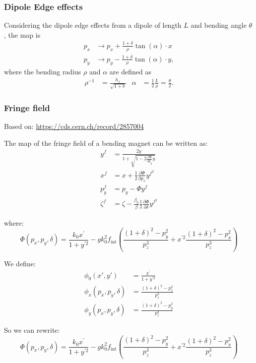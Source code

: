 \subsubsection{Dipole Edge effects}
Considering the dipole edge effects from a dipole of length $L$ and bending angle $\theta$, 
the map is
\begin{align*}
    p_x &\to p_x + \frac{1+\delta}{\rho} \tan(\alpha) \cdot x \\
    p_y &\to p_y - \frac{1+\delta}{\rho} \tan(\alpha) \cdot y,
\end{align*}
where the bending radius $\rho$ and $\alpha$ are defined as
\begin{align*}
    \rho^{-1}   &= \frac{h_x}{\sqrt{1+\delta}} &
    \alpha &= \frac{1}{2} \frac{L}{\rho} = \frac{\theta}{2}.
\end{align*}

\subsubsection{Fringe field}

Based on: \url{https://cds.cern.ch/record/2857004}

The map of the fringe field of a bending magnet can be written as:
\begin{align} 
y^f & =\frac{2 y}{1+\sqrt{1-2 \frac{\partial \Phi}{\partial p_y} y}} \\ 
x^f & =x+\frac{1}{2} \frac{\partial \Phi}{\partial p_x} y^{f^2} \\
p_y^f & =p_y-\Phi y^f \\ 
\zeta^f & =\zeta-\frac{\beta_0}{\beta}\frac{1}{2} \frac{\partial \Phi}{\partial \delta} y^{f^2}
\end{align}

where:
\begin{equation}
\Phi\left(p_x, p_y, \delta\right)=\frac{k_0 x^{\prime}}{1+y^{\prime 2}}
-g k_0^2 f_\text{int}
\left(\frac{(1+\delta)^2-p_y^2}{p_z^3}
+x^{\prime 2}
\frac{(1+\delta)^2-p_x^2}{p_z^3}\right)
\end{equation}

We define:
\begin{align}
\phi_0(x', y') &= \frac{x^{\prime}}{1+y^{\prime 2}}\\
\phi_x(p_x, p_y, \delta) &= \frac{(1+\delta)^2-p_x^2}{p_z^3}\\
\phi_y(p_x, p_y, \delta) &= \frac{(1+\delta)^2-p_y^2}{p_z^3}
\end{align}

So we can rewrite:
\begin{equation}
\Phi\left(p_x, p_y, \delta\right)=\frac{k_0 x^{\prime}}{1+y^{\prime 2}}
-g k_0^2 f_\text{int}
\left(\frac{(1+\delta)^2-p_y^2}{p_z^3}
+x^{\prime 2}
\frac{(1+\delta)^2-p_x^2}{p_z^3}\right)
\end{equation}


